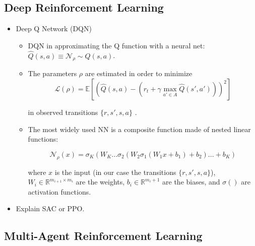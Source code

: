 \documentclass[11pt,english]{article}
\newcommand{\E}{\mathbb{E}}
\begin{document}
\subsection{Deep Reinforcement Learning}

\begin{itemize}
	\item Deep Q Network (DQN)
	\begin{itemize}
		\item DQN in approximating the Q function with a neural net: $\hat{Q}(s,a) \equiv  \mathcal{N}_\rho \sim Q(s,a)$.\medskip
		\item The parameters $\rho$ are estimated in order to minimize\medskip
		$$\mathcal{L}(\rho)=\E \left[ \left(\hat{Q}(s,a)-(r_t+\gamma \max_{a' \in A} \hat{Q}(s',a')) \right)^2 \right] $$
		
		in observed transitions $\{r, s'  ,s, a\}$ .\medskip
		
		\item The most widely used NN is a composite function made of nested linear functions:  \medskip
		
		$$\mathcal{N}_\rho (x)=\sigma_K(W_K ... \sigma_2(W_2 \sigma_1(W_1x+b_1)+b_2)...+b_K)$$
		
		where $x$ is the input (in our case the transitions $\{r, s'  ,s, a\}$), $W_i \in \mathbb{R}^{m_{i+1}\times m_i}$ are the weights, $b_i \in \mathbb{R}^{m_i+1}$ are the biases, and $\sigma()$ are activation functions.
	\end{itemize}
	\item Explain SAC or PPO.
\end{itemize}

\subsection{Multi-Agent Reinforcement Learning}
\end{document}

